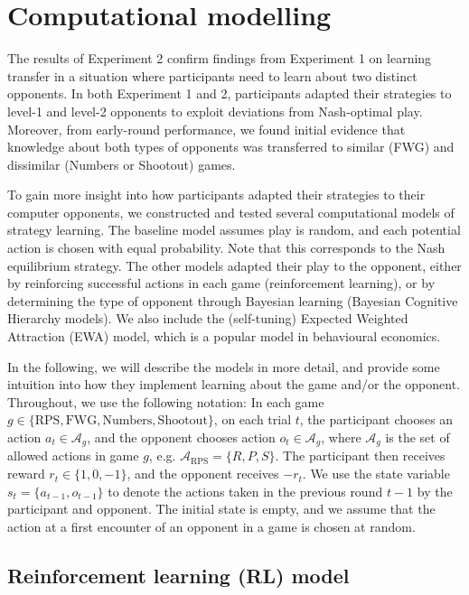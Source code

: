 \documentclass[smallextended]{svjour3}       %
\begin{document}
\hypertarget{computational-modelling}{%
\section{Computational modelling}\label{computational-modelling}}

The results of Experiment 2 confirm findings from Experiment 1 on
learning transfer in a situation where participants need to learn about
two distinct opponents. In both Experiment 1 and 2, participants adapted
their strategies to level-1 and level-2 opponents to exploit deviations
from Nash-optimal play. Moreover, from early-round performance, we found
initial evidence that knowledge about both types of opponents was
transferred to similar (FWG) and dissimilar (Numbers or Shootout) games.

To gain more insight into how participants adapted their strategies to
their computer opponents, we constructed and tested several
computational models of strategy learning. The baseline model assumes
play is random, and each potential action is chosen with equal
probability. Note that this corresponds to the Nash equilibrium
strategy. The other models adapted their play to the opponent, either by
reinforcing successful actions in each game (reinforcement learning), or
by determining the type of opponent through Bayesian learning (Bayesian
Cognitive Hierarchy models). We also include the (self-tuning) Expected
Weighted Attraction (EWA) model, which is a popular model in behavioural
economics.

In the following, we will describe the models in more detail, and
provide some intuition into how they implement learning about the game
and/or the opponent. Throughout, we use the following notation: In each
game
\(g \in \{\text{RPS},\text{FWG}, \text{Numbers}, \text{Shootout} \}\),
on each trial \(t\), the participant chooses an action
\(a_t \in \mathcal{A}_g\), and the opponent chooses action
\(o_t \in \mathcal{A}_g\), where \(\mathcal{A}_g\) is the set of allowed
actions in game \(g\), e.g. \(\mathcal{A}_\text{RPS} = \{R,P,S\}\). The
participant then receives reward \(r_t \in \{1,0,-1\}\), and the
opponent receives \(-r_t\). We use the state variable
\(s_t = \{a_{t-1},o_{t-1}\}\) to denote the actions taken in the
previous round \(t-1\) by the participant and opponent. The initial
state is empty, and we assume that the action at a first encounter of an
opponent in a game is chosen at random.

\hypertarget{reinforcement-learning-rl-model}{%
\subsection{Reinforcement learning (RL)
model}\label{reinforcement-learning-rl-model}}
\end{document}
